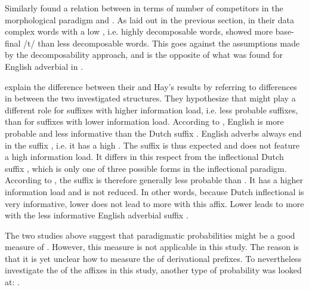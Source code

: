 {{  
 Similarly \cite{Schuppler.2012} found a relation between  in terms of number of competitors in the morphological paradigm and . 
 As laid out in the previous section, in their data complex words with a low , i.e. highly decomposable words, showed more base-final /t/  than less decomposable words. This goes against the assumptions made by the decomposability approach, and is the opposite of what was found for English adverbial  in \cite{Hay.2003}. 
 
 \cite{Schuppler.2012} explain the difference between their and Hay's results by referring to differences in  between the two investigated structures. 
 They hypothesize that  might play a different role for suffixes with higher information load, i.e. less probable suffixes, than for suffixes with lower information load. According to \cite{Schuppler.2012}, English  is more probable and less informative than the Dutch suffix . 
 English adverbs always end in the suffix , i.e. it has a high . The suffix is thus expected and does not feature a high information load. It differs in this respect from the inflectional Dutch suffix , which is only one of three possible forms in the inflectional paradigm. According to \cite{Schuppler.2012}, the suffix  is therefore generally less probable than . It has a higher information load and is not reduced. In other words, because Dutch inflectional  is very informative, lower  does not lead to more  with this affix. Lower  leads to more  with the less informative English adverbial suffix  .
 
 
The two studies above suggest that paradigmatic probabilities might be a good measure of . However, this measure is not applicable in this study. The reason is that it is yet unclear how to measure the  of derivational prefixes. 
 To nevertheless investigate the  of the affixes in this study, 
another type of probability was looked at: . 

}}
